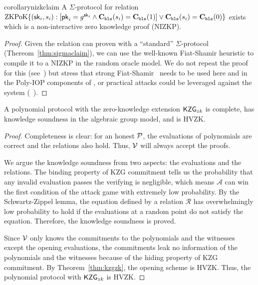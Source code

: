 
\begin{restatable}{corollary}{nizkclaim}
\label{thm:nizkclaim}
A $\Sigma$-protocol for relation $\mathrm{ZKPoK} \{ (\mathsf{sk}_i,s_i) :  [\mathsf{pk}_i=g^{\mathsf{sk}_i} \land \textbf{C}_\texttt{bls}(s_i)=\textbf{C}_\texttt{bls}(1)  ] \lor \textbf{C}_\texttt{bls}(s_i)=\textbf{C}_\texttt{bls}(0) \}$ exists which is a non-interactive zero knowledge proof (NIZKP).
\end{restatable}
    
\begin{proof}
Given the relation can proven with a ``standard'' $\Sigma$-protocol (Thereom~\ref{thm:sigmaclaim}), we can use the well-known Fiat-Shamir heuristic to compile it to a NIZKP in the random oracle model. We do not repeat the proof for this (see~\cite{damgard10,sigma}) but stress that strong Fiat-Shamir~\cite{weakfs} needs to be used here and in the Poly-IOP components of \Sys, or practical attacks could be leveraged against the system (\cf~\cite{weakfsattacks}).
\end{proof}


\begin{theorem}
\label{thm:polyproto}
A polynomial protocol with the zero-knowledge extension $\mathsf{KZG}_{zk}$ is complete, has knowledge soundness in the algebraic group model, and is HVZK.
\end{theorem}

\begin{proof}
Completeness is clear: for an honest $\mathcal{P}$, the evaluations of polynomials are correct and the relations also hold. Thus, $\mathcal{V}$ will always accept the proofs.

We argue the knowledge soundness from two aspects: the evaluations and the relations. The binding property of KZG commitment tells us the probability that any invalid evaluation passes the verifying is negligible, which means $\mathcal{A}$ can win the first condition of the attack game with extremely low probability. By the Schwartz-Zippel lemma, the equation defined by a relation $\mathcal{R}$ has overwhelmingly low probability to hold if the evaluations at a random point do not satisfy the equation. Therefore, the knowledge soundness is proved.

Since $\mathcal{V}$ only knows the commitments to the polynomials and the witnesses except the opening evaluations, the commitments leak no information of the polynomials and the witnesses because of the hiding property of KZG commitment. By Theorem~\ref{thm:kzgzk}, the opening scheme is HVZK. Thus, the polynomial protocol with $\mathsf{KZG}_{zk}$ is HVZK.
\end{proof}

